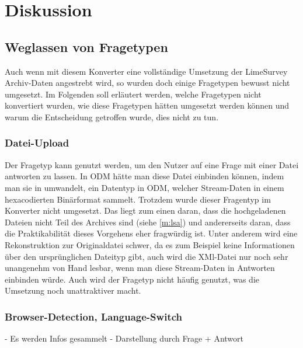 \chapter{Diskussion}
\label{ch:diskussion}



\section{Weglassen von Fragetypen}
\label{d:leave}

Auch wenn mit diesem Konverter eine vollständige Umsetzung der LimeSurvey Archiv-Daten angestrebt wird, so wurden doch einige Fragetypen bewusst nicht umgesetzt.
Im Folgenden soll erläutert werden, welche Fragetypen nicht konvertiert wurden, wie diese Fragetypen hätten umgesetzt werden können und warum die Entscheidung getroffen wurde, dies nicht zu tun.

\subsection{Datei-Upload}

Der Fragetyp  kann genutzt werden, um den Nutzer auf eine Frage mit einer Datei antworten zu lassen.
In ODM hätte man diese Datei einbinden können, indem man sie in  umwandelt, ein Datentyp in ODM, welcher Stream-Daten in einem hexacodierten Binärformat sammelt.
Trotzdem wurde dieser Fragentyp im Konverter nicht umgesetzt.
Das liegt zum einen daran, dass die hochgeladenen Dateien nicht Teil des Archives sind (siehe \cref{m:lsa}) und andererseits daran, dass die Praktikabilität dieses Vorgehens eher fragwürdig ist.
Unter anderem wird eine Rekonstruktion zur Originaldatei schwer, da es zum Beispiel keine Informationen über den ursprünglichen Dateityp gibt, auch wird die XMl-Datei nur noch sehr unangenehm von Hand lesbar, wenn man diese Stream-Daten in Antworten einbinden würde. 
Auch wird der Fragetyp nicht häufig genutzt, was die Umsetzung noch unattraktiver macht.

\subsection{Browser-Detection, Language-Switch}

- Es werden Infos gesammelt
- Darstellung durch Frage + Antwort

